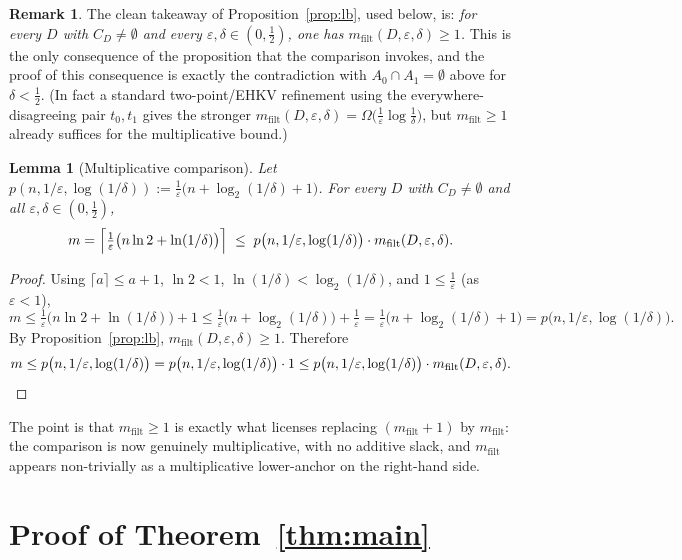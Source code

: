 \documentclass{amsart}
\newtheorem{lemma}{Lemma}
\theoremstyle{definition}
\newtheorem{remark}{Remark}
\newcommand{\eps}{\varepsilon}
\begin{document}
\begin{remark}
The clean takeaway of Proposition~\ref{prop:lb}, used below, is:
\emph{for every $D$ with $C_D\neq\emptyset$ and every $\eps,\delta\in(0,\tfrac12)$,
one has $m_{\mathrm{filt}}(D,\eps,\delta)\ge1$.} This is the only consequence of
the proposition that the comparison invokes, and the proof of this consequence is
exactly the contradiction with $A_0\cap A_1=\emptyset$ above for $\delta<\tfrac12$.
(In fact a standard two-point/EHKV refinement using the everywhere-disagreeing
pair $t_0,t_1$ gives the stronger
$m_{\mathrm{filt}}(D,\eps,\delta)=\Omega\bigl(\tfrac1\eps\log\tfrac1\delta\bigr)$,
but $m_{\mathrm{filt}}\ge1$ already suffices for the multiplicative bound.)
\end{remark}

\begin{lemma}[Multiplicative comparison]\label{lem:compare}
Let $p(n,1/\eps,\log(1/\delta)):=\frac1\eps\bigl(n+\log_2(1/\delta)+1\bigr)$.
For every $D$ with $C_D\neq\emptyset$ and all $\eps,\delta\in(0,\tfrac12)$,
\[
  m=\Bigl\lceil \tfrac1\eps\bigl(n\ln 2+\ln(1/\delta)\bigr)\Bigr\rceil
  \;\le\; p\bigl(n,1/\eps,\log(1/\delta)\bigr)\cdot
          m_{\mathrm{filt}}(D,\eps,\delta).
\]
\end{lemma}

\begin{proof}
Using $\lceil a\rceil\le a+1$, $\ln2<1$, $\ln(1/\delta)<\log_2(1/\delta)$, and
$1\le\frac1\eps$ (as $\eps<1$),
\[
  m \le \tfrac1\eps\bigl(n\ln2+\ln(1/\delta)\bigr)+1
     \le \tfrac1\eps\bigl(n+\log_2(1/\delta)\bigr)+\tfrac1\eps
     = \tfrac1\eps\bigl(n+\log_2(1/\delta)+1\bigr)
     = p\bigl(n,1/\eps,\log(1/\delta)\bigr).
\]
By Proposition~\ref{prop:lb}, $m_{\mathrm{filt}}(D,\eps,\delta)\ge1$. Therefore
\[
  m \le p\bigl(n,1/\eps,\log(1/\delta)\bigr)
     = p\bigl(n,1/\eps,\log(1/\delta)\bigr)\cdot 1
     \le p\bigl(n,1/\eps,\log(1/\delta)\bigr)\cdot
         m_{\mathrm{filt}}(D,\eps,\delta).\qedhere
\]
\end{proof}

The point is that $m_{\mathrm{filt}}\ge1$ is exactly what licenses replacing
$(m_{\mathrm{filt}}+1)$ by $m_{\mathrm{filt}}$: the comparison is now genuinely
multiplicative, with no additive slack, and $m_{\mathrm{filt}}$ appears
non-trivially as a multiplicative lower-anchor on the right-hand side.

\section{Proof of Theorem~\ref{thm:main}}\label{sec:thm}
\end{document}
